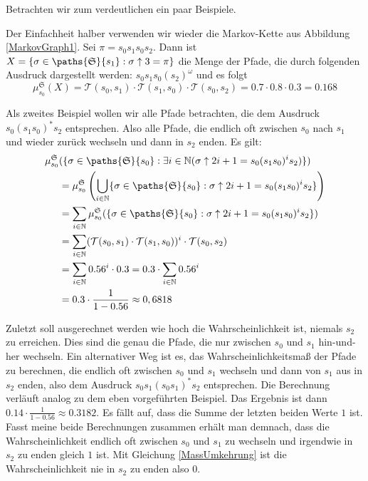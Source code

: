 Betrachten wir zum verdeutlichen ein paar Beispiele.
\begin{example}[Wahrscheinlichkeitsmaße]
	Der Einfachheit halber verwenden wir wieder die Markov-Kette aus Abbildung \ref{MarkovGraph1}. Sei $\pi=s_0s_1s_0s_2$. 
	Dann ist $X=\{\sigma \in \paths{\mathfrak{S}}{s_1} : \sigma\uparrow 3 = \pi\}$ die Menge der Pfade, die durch folgenden Ausdruck dargestellt werden: $s_0s_1s_0(s_2)^\omega$ und es folgt
	$$\mu^\mathfrak{S}_{s_0}(X)=\mathcal{T}(s_0,s_1) \cdot \mathcal{T}(s_1,s_0) \cdot \mathcal{T}(s_0,s_2) = 0.7 \cdot 0.8 \cdot 0.3 = 0.168$$
	
	Als zweites Beispiel wollen wir alle Pfade betrachten, die dem Ausdruck $s_0(s_1s_0)^\ast s_2$ entsprechen. Also alle Pfade, die endlich oft zwischen $s_0$ nach $s_1$ und wieder zurück wechseln und dann in $s_2$ enden. Es gilt:
	\begin{align*}
		\mu^\mathfrak{S}_{s_0}&(\{\sigma\in \paths{\mathfrak{S}}{s_0} : \exists i\in \mathbb{N} (\sigma\uparrow 2i+1 = s_0(s_1s_0)^i s_2)\}) \\
		&=\mu^\mathfrak{S}_{s_0} \left(\bigcup_{i\in \mathbb{N}} \{\sigma\in \paths{\mathfrak{S}}{s_0} : \sigma\uparrow 2i+1 = s_0(s_1s_0)^i s_2\}\right) \\
		&=\sum_{i\in \mathbb{N}} \mu^\mathfrak{S}_{s_0}(\{\sigma\in \paths{\mathfrak{S}}{s_0} : \sigma\uparrow 2i+1 = s_0(s_1s_0)^i s_2\}) \\
		&=\sum_{i\in \mathbb{N}} (\mathcal{T}(s_0, s_1) \cdot \mathcal{T}(s_1, s_0))^i \cdot \mathcal{T}(s_0,s_2) \\
		&=\sum_{i\in \mathbb{N}} 0.56^i \cdot 0.3 = 0.3 \cdot \sum_{i\in \mathbb{N}} 0.56^i \\
		&= 0.3 \cdot \frac{1}{1-0.56} \approx 0,6818
	\end{align*}
	
	Zuletzt soll ausgerechnet werden wie hoch die Wahrscheinlichkeit ist, niemals $s_2$ zu erreichen. 
	Dies sind die genau die Pfade, die nur zwischen $s_0$ und $s_1$ hin-und-her wechseln. 
	Ein alternativer Weg ist es, das Wahrscheinlichkeitsmaß der Pfade zu berechnen, die endlich oft zwischen $s_0$ und $s_1$ wechseln und dann von $s_1$ aus in $s_2$ enden, also dem Ausdruck $s_0s_1(s_0s_1)^\ast s_2$ entsprechen. Die Berechnung verläuft analog zu dem eben vorgeführten Beispiel. Das Ergebnis ist dann $0.14\cdot\frac{1}{1-0.56} \approx 0.3182$. Es fällt auf, dass die Summe der letzten beiden Werte $1$ ist. Fasst meine beide Berechnungen zusammen erhält man demnach, dass die Wahrscheinlichkeit endlich oft zwischen $s_0$ und $s_1$ zu wechseln und irgendwie in $s_2$ zu enden gleich $1$ ist. Mit Gleichung \ref{MassUmkehrung} ist die Wahrscheinlichkeit nie in $s_2$ zu enden also $0$.
\end{example}

